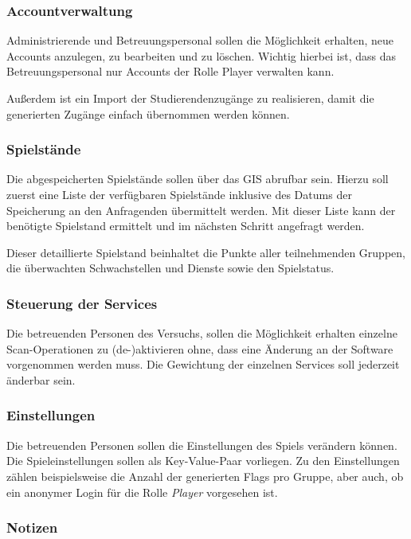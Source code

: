 \subsubsection{Accountverwaltung}

Administrierende und Betreuungspersonal sollen die Möglichkeit erhalten, neue Accounts anzulegen, zu bearbeiten und zu löschen. Wichtig hierbei ist, dass das Betreuungspersonal nur Accounts der Rolle Player verwalten kann.

Außerdem ist ein Import der Studierendenzugänge zu realisieren, damit die generierten Zugänge einfach übernommen werden können.

\subsubsection{Spielstände}

Die abgespeicherten Spielstände sollen über das GIS abrufbar sein. Hierzu soll zuerst eine Liste der verfügbaren Spielstände inklusive des Datums der Speicherung an den Anfragenden übermittelt werden. Mit dieser Liste kann der benötigte Spielstand ermittelt und im nächsten Schritt angefragt werden. 

Dieser detaillierte Spielstand beinhaltet die Punkte aller teilnehmenden Gruppen, die überwachten Schwachstellen und Dienste sowie den Spielstatus.

\subsubsection{Steuerung der Services}

Die betreuenden Personen des Versuchs, sollen die Möglichkeit erhalten einzelne \\
Scan-Operationen zu (de-)aktivieren ohne, dass eine Änderung an der Software vorgenommen werden muss. Die Gewichtung der einzelnen Services soll jederzeit änderbar sein.

\subsubsection{Einstellungen}

Die betreuenden Personen sollen die Einstellungen des Spiels verändern können. Die Spieleinstellungen sollen als Key-Value-Paar vorliegen. Zu den Einstellungen zählen beispielsweise die Anzahl der generierten Flags pro Gruppe, aber auch, ob ein anonymer Login für die Rolle \textit{Player} vorgesehen ist.

\subsubsection{Notizen}

